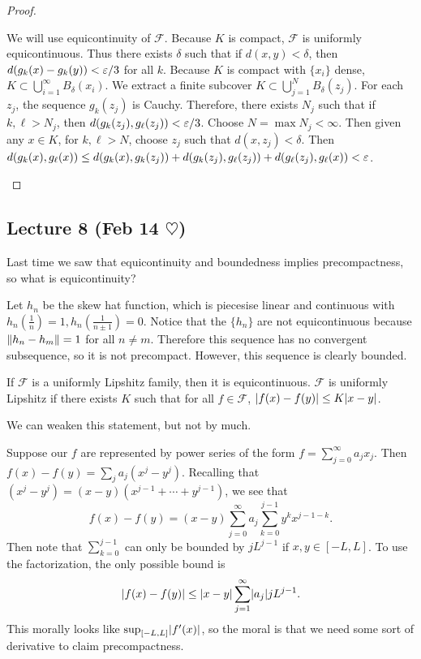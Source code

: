 \documentclass[10pt, twoside]{article}
\begin{document}
\begin{thm}
\begin{proof}
\begin{enumerate}
                We will use equicontinuity of $\mathcal{F}$. Because $K$ is
        compact, $\mathcal{F}$ is uniformly equicontinuous. Thus there exists
$\delta$ such that if $d(x,y) < \delta$, then $d(g_k(x) - g_k(y)) < \varepsilon/3$ for
all $k$. Because $K$ is compact with $\{x_i\}$ dense, $K \subset
\bigcup_{i=1}^{\infty} B_{\delta}(x_i)$. We extract a finite subcover $K
\subset \bigcup_{j=1}^N B_{\delta}(z_j)$. For each $z_j$, the sequence
$g_k(z_j)$ is Cauchy. Therefore, there exists $N_j$ such that if $k,\ell >
N_j$, then $d(g_k(z_j), g_{\ell}(z_j)) < \varepsilon/3$. Choose $N = \max N_j <
\infty$. Then given any $x \in K$, for $k,\ell > N$, choose $z_j$ such that
$d(x, z_j) < \delta$. Then $d(g_k(x), g_{\ell}(x)) \leq d(g_k(x), g_k(z_j)) +
d(g_k(z_j), g_{\ell}(z_j)) + d(g_{\ell}(z_j), g_{\ell}(x)) < \varepsilon$. \qedhere
\end{enumerate} \end{proof} \end{thm}

    \subsection{Lecture 8 (Feb 14 $\heartsuit$)} Last time we saw that
    equicontinuity and boundedness implies precompactness, so what is
    equicontinuity?

    \begin{exm} Let $h_n$ be the skew hat function, which
        is piecesise linear and continuous with $h_n(\frac{1}{n}) = 1,
        h_n(\frac{1}{n \pm 1}) = 0$. Notice that the $\{h_n\}$ are not
        equicontinuous because $\lVert h_n - h_m\rVert = 1$ for all $n \neq m$.
        Therefore this sequence has no convergent subsequence, so it is not
        precompact. However, this sequence is clearly bounded.  \end{exm}

    \begin{exm} If $\mathcal{F}$ is a uniformly Lipshitz family, then it is
    equicontinuous. $\mathcal{F}$ is uniformly Lipshitz if there exists $K$
such that for all $f \in \mathcal{F}$, $\lvert f(x) - f(y)\rvert \leq K\lvert x-y\rvert$.
\end{exm}

    We can weaken this statement, but not by much.

    \begin{exm} Suppose our $f$ are represented by power series of the form $f
        = \sum_{j=0}^{\infty} a_jx_j$. Then $f(x)-f(y) = \sum_j a_j(x^j-y^j)$.
        Recalling that $(x^j - y^j) = (x-y)(x^{j-1} + \cdots + y^{j-1})$, we
        see that \[f(x) - f(y) = (x-y) \sum_{j=0}^{\infty} a_j \sum_{k=0}^{j-1}
            y^kx^{j-1-k}.\] Then note that $\sum_{k=0}^{j-1}$ can only be
            bounded by $jL^{j-1}$ if $x,y \in [-L,L]$. To use the
            factorization, the only possible bound is \[\lvert f(x) - f(y)\rvert \leq
            \lvert x-y\rvert\sum_{j=1}^{\infty} \lvert a_j\rvert jL^{j-1}.\] This morally
            looks like $\sup_{[-L,L]} \lvert f'(x)\rvert$, so the moral is that we
            need some sort of derivative to claim precompactness.  \end{exm}
\end{document}
